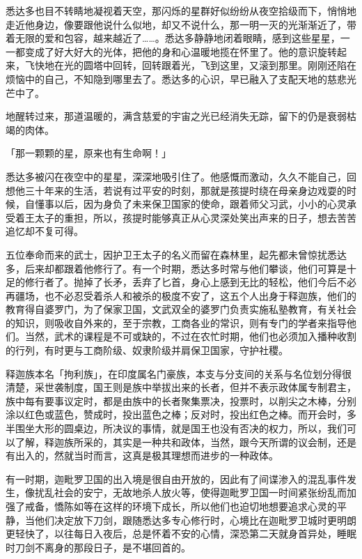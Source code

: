 \documentclass[twoside,openany]{book}
\begin{document}
悉达多也目不转睛地凝视着天空，那闪烁的星群好似纷纷从夜空拾级而下，悄悄地走近他身边，像要跟他说什么似地，却又不说什么，那一明一灭的光渐渐近了，带着无限的爱和包容，越来越近了……。悉达多静静地闭着眼睛，感到这些星星，一一都变成了好大好大的光体，把他的身和心温暖地揽在怀里了。他的意识旋转起来，飞快地在光的圆塔中回转，回转跟着光，飞到这里，又滚到那里。刚刚还陷在烦恼中的自己，不知隐到哪里去了。悉达多的心识，早已融入了支配天地的慈悲光芒中了。

地醒转过来，那道温暖的，满含慈爱的宇宙之光已经消失无踪，留下的仍是衰弱枯竭的肉体。

「那一颗颗的星，原来也有生命啊！」

悉达多被闪在夜空中的星星，深深地吸引住了。他感慨而激动，久久不能自己，回想他三十年来的生活，若说有过平安的时刻，那就是孩提时绕在母亲身边戏耍的时候，自懂事以后，因为身负了未来保卫国家的使命，跟着师父习武，小小的心灵承受着王太子的重担，所以，孩提时能够真正从心灵深处笑出声来的日子，想去苦苦追忆却不复可得。

五位奉命而来的武士，因护卫王太子的名义而留在森林里，起先都未曾惊扰悉达多，后来却都跟着他修行了。有一个时期，悉达多时常与他们攀谈，他们可算是十足的修行者了。抛掉了长矛，丢弃了匕首，身心上感到无比的轻松，他们今后不必再疆场，也不必忍受着杀人和被杀的极度不安了，这五个人出身于释迦族，他们的教育得自婆罗门，为了保家卫国，文武双全的婆罗门负责实施私塾教育，有关社会的知识，则吸收自外来的，至于宗教，工商各业的常识，则有专门的学者来指导他们。当然，武术的课程是不可或缺的，不过在农忙时期，他们也必须加入播种收割的行列，有时更与工商阶级、奴隶阶级并肩保卫国家，守护社稷。

释迦族本名「拘利族」，在印度属名门豪族，本支与分支间的关系与名位划分得很清楚，采世袭制度，国王则是族中举拔出来的长者，但并不表示政体属专制君主，族中每有要事议定时，都是由族中的长者聚集票决，投票时，以削尖之木棒，分别涂以红色或蓝色，赞成时，投出蓝色之棒；反对时，投出红色之棒。而开会时，多半围坐大形的圆桌边，所决议的事情，就是国王也没有否决的权力，所以，我们可以了解，释迦族所采的，其实是一种共和政体，当然，跟今天所谓的议会制，还是有出入的，然就当时而言，这真是极其理想而进步的一种政体。

有一时期，迦毗罗卫国的出入境是很自由开放的，因此有了间谍渗入的混乱事件发生，像扰乱社会的安宁，无故地杀人放火等，使得迦毗罗卫国一时间紧张纷乱而加强了戒备，憍陈如等在这样的环境下成长，所以他们也迫切地想要追求心灵的平静，当他们决定放下刀剑，跟随悉达多专心修行时，心境比在迦毗罗卫城时更明朗更轻快了，以往每日入夜后，总是怀着不安的心情，深恐第二天就身首异处，睡眠时刀剑不离身的那段日子，是不堪回首的。
\end{document}
